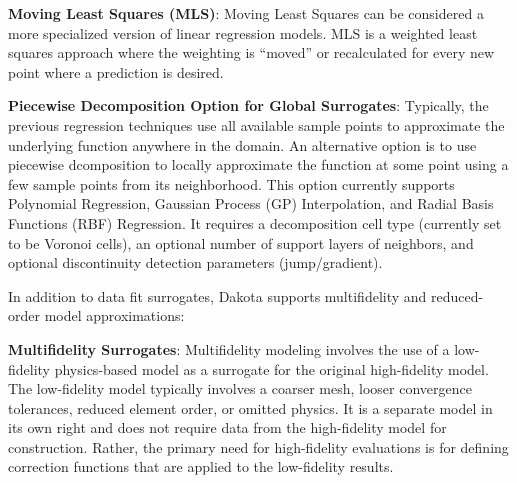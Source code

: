 \textbf{Moving Least Squares (MLS)}: Moving Least Squares can be 
considered a more specialized version of linear regression models.
MLS is a weighted least squares approach where the weighting is 
``moved'' or recalculated for every new point where 
a prediction is desired.~\cite{Nea04} 

\textbf{Piecewise Decomposition Option for Global Surrogates}: Typically, the previous regression techniques use all available sample points to approximate the underlying function anywhere in the domain. An alternative option is to use piecewise dcomposition to locally approximate the function at some point using a few sample points from its neighborhood. This option currently supports Polynomial Regression, Gaussian Process (GP) Interpolation, and Radial Basis Functions (RBF) Regression. It requires a decomposition cell type (currently set to be Voronoi cells), an optional number of support layers of neighbors, and optional discontinuity detection parameters (jump/gradient).   



In addition to data fit surrogates, Dakota supports multifidelity 
and reduced-order model approximations:

\textbf{Multifidelity Surrogates}: Multifidelity modeling involves the
use of a low-fidelity physics-based model as a surrogate for the
original high-fidelity model.  The low-fidelity model typically
involves a coarser mesh, looser convergence tolerances, reduced
element order, or omitted physics.  It is a separate model in its own
right and does not require data from the high-fidelity model for
construction.  Rather, the primary need for high-fidelity evaluations
is for defining correction functions that are applied to the
low-fidelity results.

